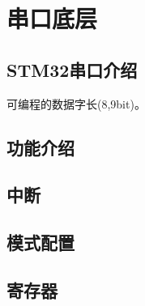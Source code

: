 \section{串口底层}


\subsection{STM32串口介绍}

可编程的数据字长(8,9bit)。


\subsection{功能介绍}

\subsection{中断}

\subsection{模式配置}

\subsection{寄存器}
